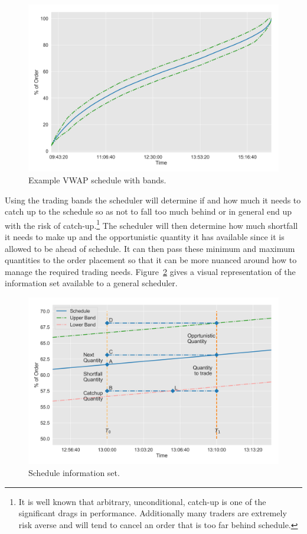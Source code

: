	\begin{figure}[!ht]
	\centering
	\includegraphics[width=\textwidth]{chapters/chapter_exec_models/figures/schedule.png} 
	\caption{Example VWAP schedule with bands. \label{fig:schedule}}
	\end{figure}

Using the trading bands the scheduler will determine if and how much it needs to catch up to the schedule so as not to fall too much behind or in general end up with the risk of catch-up.\footnote{It is well known that arbitrary, unconditional, catch-up is one of the significant drags in performance. Additionally many traders are extremely risk averse and will tend to cancel an order that is too far behind schedule.} The scheduler will then determine how much shortfall it needs to make up and the opportunistic quantity it has available since it is allowed to be ahead of schedule. It can then pass these minimum and maximum quantities to the order placement so that it can be more nuanced around how to manage the required trading needs. Figure~\ref{fig:sch_details} gives a visual representation of the information set available to a general scheduler.

	\begin{figure}[!ht]
	\centering
	\includegraphics[width=\textwidth]{chapters/chapter_exec_models/figures/schedule_details.png} 
	\caption{Schedule information set. \label{fig:sch_details}}
	\end{figure}

